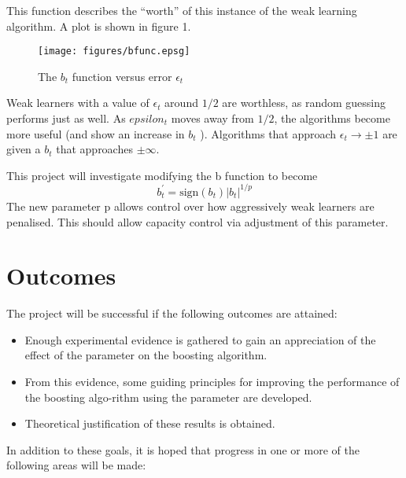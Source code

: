 	This function describes the ``worth'' of this instance of the weak
learning algorithm.  A plot is shown in figure 1.

\begin{figure}
\begin{center}
\texttt{[image: figures/bfunc.epsg]}
\end{center}
\caption{The $b_t$ function versus error $\epsilon_t$}
\end{figure}
 
Weak learners with a value of $\epsilon_t$ around $1/2$ are worthless,
as random guessing performs just as well.  As $epsilon_t$ moves away
from $1/2$, the algorithms become more useful (and show an increase in
$b_t$ ).  Algorithms that approach $\epsilon_t \rightarrow \pm 1$ are
given a $b_t$  that approaches $\pm \infty$.

This project will investigate modifying the b function to become
\begin{equation}
b^{\prime}_t = \mathrm{sign}(b_t) |b_t|^{1/p}
\end{equation}
The new parameter p allows control over how aggressively weak learners
are penalised.  This should allow capacity control via adjustment of
this parameter.

\section{Outcomes}
The project will be successful if the following outcomes are attained:

\begin{itemize}
\item	Enough experimental evidence is gathered to gain an
	appreciation of the effect of the   parameter on the boosting
	algorithm.

\item	From this evidence, some guiding principles for improving the
	performance of the boosting algo-rithm using the   parameter
	are developed.

\item	Theoretical justification of these results is obtained.
\end{itemize}

In addition to these goals, it is hoped that progress in one or more of the following areas will be made:

